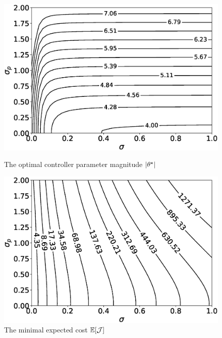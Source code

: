 \begin{figure}[tb]
  \centering
    \begin{minipage}{.48\textwidth}
        \centering
        \includegraphics[width=\linewidth]{./figures/optimal_ctrl.eps}
        \caption{The optimal controller parameter magnitude $\left|{\theta^\star}\right|$}
        \label{fig:iwp-projections}
    \end{minipage}%
    \hfill
    \begin{minipage}{0.46\textwidth}
        \centering
        \includegraphics[width=\linewidth]{./figures/optimal_cost.eps}
        \caption{The minimal expected cost $\mathbb{E}[\mathcal{J}]$}
        \label{fig:iwp-loss}
    \end{minipage}
  \label{fig:optimal-ctrl-cost}
\end{figure}

